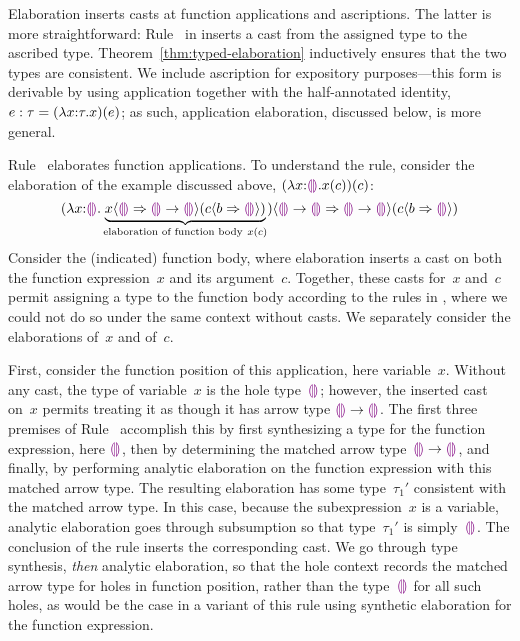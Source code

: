 Elaboration inserts casts at function applications and ascriptions.
%
The latter is more straightforward: Rule~
in  inserts a cast from the assigned type to the
ascribed type.
%
Theorem~\ref{thm:typed-elaboration} inductively ensures that the two types
are consistent.
%
We include ascription for expository purposes---this form is derivable
by using application together with the half-annotated identity, $e
: \tau = (\lambda x{:}\tau.x)(e)$; as such, application
elaboration, discussed below, is more general.

Rule~ elaborates function applications.
%
To understand the rule, consider the elaboration of the example
discussed above, $(\lambda x{:}\textcolor{violet}{\llparenthesis}\textcolor{violet}{\rrparenthesis}.x(c))(c)$:
\[
        \hap{\dcasttwo{
        (\halam{x}{\tehole}{\underbrace{
                \hap{\dcasttwo{x}{\tehole}{\tarr{\tehole}{\tehole}}}
                {\dcasttwo{c}{b}{\tehole}}
                }_{\textrm{elaboration of function body}~x(c)}
        }
        )}{\tarr{\tehole}{\tehole}}{
           \tarr{\tehole}{\tehole}}
           }
           {\dcasttwo{c}{b}{\tehole}}
\]
Consider the (indicated) function body,
%
where elaboration inserts a cast on both the function expression~$x$ and
its argument~$c$.
%
Together, these casts for~$x$ and~$c$ permit assigning a type to the
function body according to the rules in , where we
could not do so under the same context without casts.
%
We separately consider the elaborations of~$x$ and of~$c$.

First, consider the function position of this application, here variable~$x$.
%
Without any cast, the type of variable~$x$ is the hole type~$\textcolor{violet}{\llparenthesis}\textcolor{violet}{\rrparenthesis}$;
however, the inserted cast on~$x$ permits treating it as though it has
arrow type $\textcolor{violet}{\llparenthesis}\textcolor{violet}{\rrparenthesis} \rightarrow \textcolor{violet}{\llparenthesis}\textcolor{violet}{\rrparenthesis}$.
%
The first three premises of Rule~ accomplish this
%
by first synthesizing a type for the function expression, here
$\textcolor{violet}{\llparenthesis}\textcolor{violet}{\rrparenthesis}$, then
%
by determining the matched arrow type~$\textcolor{violet}{\llparenthesis}\textcolor{violet}{\rrparenthesis} \rightarrow \textcolor{violet}{\llparenthesis}\textcolor{violet}{\rrparenthesis}$, and
finally,
%
by performing analytic elaboration on the function expression with this
matched arrow type.
%
The resulting elaboration has some type~$\tau_1'$ consistent with the
matched arrow type.
%
In this case, because the subexpression~$x$ is a variable, analytic
elaboration goes through subsumption so that type~$\tau_1'$ is
simply~$\textcolor{violet}{\llparenthesis}\textcolor{violet}{\rrparenthesis}$.
%
The conclusion of the rule inserts the corresponding cast.
%
We go through type synthesis, \emph{then} analytic elaboration, so that the
hole context records the matched arrow type for holes in function position,
rather than the type~$\textcolor{violet}{\llparenthesis}\textcolor{violet}{\rrparenthesis}$ for all such holes, as would be the case in
a variant of this rule using synthetic elaboration for the function
expression.


